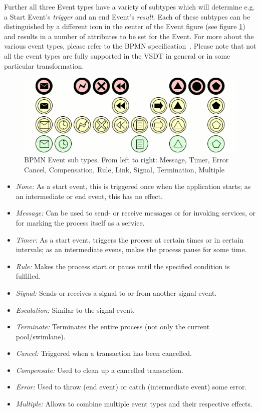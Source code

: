 Further all three Event types have a variety of subtypes which will determine
e.g. a Start Event's \emph{trigger} and an end Event's \emph{result}.  Each of
these subtypes can be distinguished by a different icon in the center of the Event
figure (see figure \ref{fig:triggers}) and results in a number of attributes to
be set for the Event. For more about the various event types, please refer to the
BPMN specification~\cite{omg2009bpmn}. Please note that not all the event types
are fully supported in the VSDT in general or in some particular transformation.

\begin{figure}[ht]
	\centering
	\includegraphics[width=.75\textwidth]{figures/bpmn/triggers.png}
	\caption[BPMN Event sub types]{BPMN Event sub types.  From left to right:
	Message, Timer, Error Cancel, Compensation, Rule, Link, Signal, Termination,
	Multiple}
	\label{fig:triggers}
\end{figure}

\begin{itemize}
	\item \emph{None:} As a start event, this is triggered once when the application starts; as an intermediate or end event, this has no effect.
	\item \emph{Message:} Can be used to send- or receive messages or for invoking services, or for marking the process itself as a service.
	\item \emph{Timer:} As a start event, triggers the process at certain times or in certain intervals; as an intermediate evens, makes the process pause for some time.
	\item \emph{Rule:} Makes the process start or pause until the specified condition is fulfilled.
	\item \emph{Signal:} Sends or receives a signal to or from another signal event.
	\item \emph{Escalation:} Similar to the signal event.
	\item \emph{Terminate:} Terminates the entire process (not only the current pool/swimlane).
	\item \emph{Cancel:} Triggered when a transaction has been cancelled.
	\item \emph{Compensate:} Used to clean up a cancelled transaction.
	\item \emph{Error:} Used to throw (end event) or catch (intermediate event) some error.
	\item \emph{Multiple:} Allows to combine multiple event types and their respective effects.
\end{itemize}



